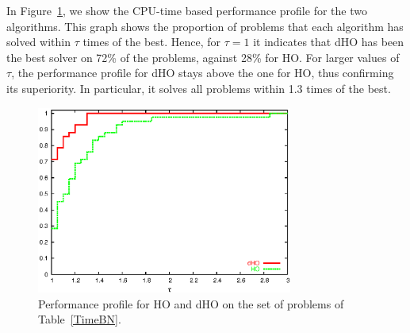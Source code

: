 In Figure~\ref{fig:PerfProfile}, we show the CPU-time based 
performance profile \cite{DolanMore} for the two algorithms. 
This graph shows the proportion of problems that each algorithm
has solved within $\tau$ times of the best. Hence, for
$\tau = 1$ it indicates that dHO has been the best solver on 72\%
of the problems, against 28\% for HO. For larger values of $\tau$,
the performance profile for dHO stays above the one for HO, thus
confirming its superiority. In particular, it solves all problems
within 1.3 times of the best.
%
\begin{figure}[ht]
  \centering
  \includegraphics[width=0.75\textwidth]{figures/perfprof-BN.eps}
  \caption{Performance profile for HO and dHO on the set of problems
    of Table~\ref{TimeBN}.}
  \label{fig:PerfProfile}
\end{figure}

% 
%

